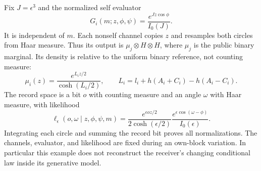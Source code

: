 Fix $J=\epsilon^3$ and the normalized self evaluator
\begin{equation}
 G_i(m;z,\phi,\psi)=\frac{e^{Jz\cos\phi}}{I_0(J)}.
 \label{pa:angular-evaluator}
\end{equation}
It is independent of $m$. Each nonself channel copies $z$ and resamples both circles from Haar measure. Thus its output is $\mu_j\otimes H\otimes H$, where $\mu_j$ is the public binary marginal. Its density is relative to the uniform binary reference, not counting measure:
\begin{equation}
 \mu_i(z)=\frac{e^{L_i z/2}}{\cosh(L_i/2)},\qquad
 L_i=l_i+h(A_i+C_i)-h(A_i-C_i).
 \label{pa:public-odds}
\end{equation}
The record space is a bit $o$ with counting measure and an angle $\omega$ with Haar measure, with likelihood
\begin{equation}
 \ell_{\epsilon}(o,\omega\mid z,\phi,\psi,m)
 =\frac{e^{\epsilon oz/2}}{2\cosh(\epsilon/2)}
  \frac{e^{\epsilon\cos(\omega-\phi)}}{I_0(\epsilon)}.
 \label{pa:angular-record}
\end{equation}
Integrating each circle and summing the record bit proves all normalizations. The channels, evaluator, and likelihood are fixed during an own-block variation. In particular this example does not reconstruct the receiver's changing conditional law inside its generative model.


